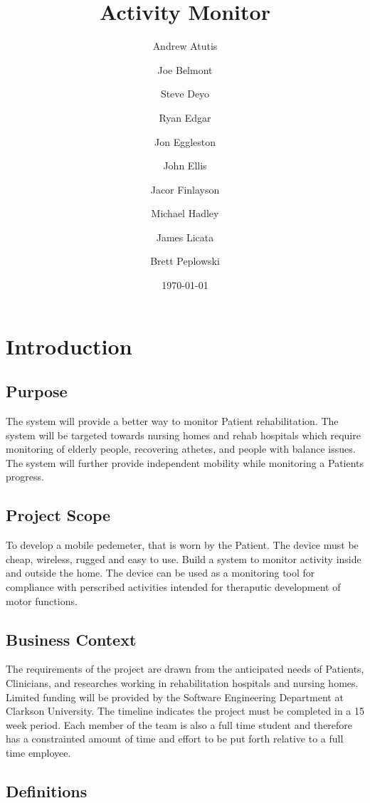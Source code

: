 \documentclass{article}
\title{Activity Monitor}
\author{Andrew Atutis \and Joe Belmont \and Steve Deyo \and Ryan Edgar \and Jon Eggleston \and John Ellis \and Jacor Finlayson \and Michael Hadley \and James Licata \and Brett Peplowski}
\date{\today}
\begin{document}
\begin{titlepage}
\maketitle
\end{titlepage}


\tableofcontents

\newpage

\section{Introduction}

\subsection{Purpose}
The system will provide a better way to monitor Patient rehabilitation.  The system will be targeted towards nursing homes and rehab hospitals which require monitoring of elderly people, recovering athetes, and people with balance issues. The system will further provide independent mobility while monitoring a Patients progress.

\subsection{Project Scope}
To develop a mobile pedemeter, that is worn by the Patient. The device must be cheap, wireless, rugged and easy to use. Build a system to monitor activity inside and outside the home. The device can be used as a monitoring tool for compliance with perscribed activities intended for theraputic development of motor functions.

\subsection{Business Context}
The requirements of the project are drawn from the anticipated needs of Patients, Clinicians, and researches working in rehabilitation hospitals and nursing homes.  Limited funding will be provided by the Software Engineering Department at Clarkson University. The timeline indicates the project must be completed in a 15 week period.  Each member of the team is also a full time student and therefore has a constrainted amount of time and effort to be put forth relative to a full time employee.

\subsection{Definitions}\label{defs}
\end{document}
